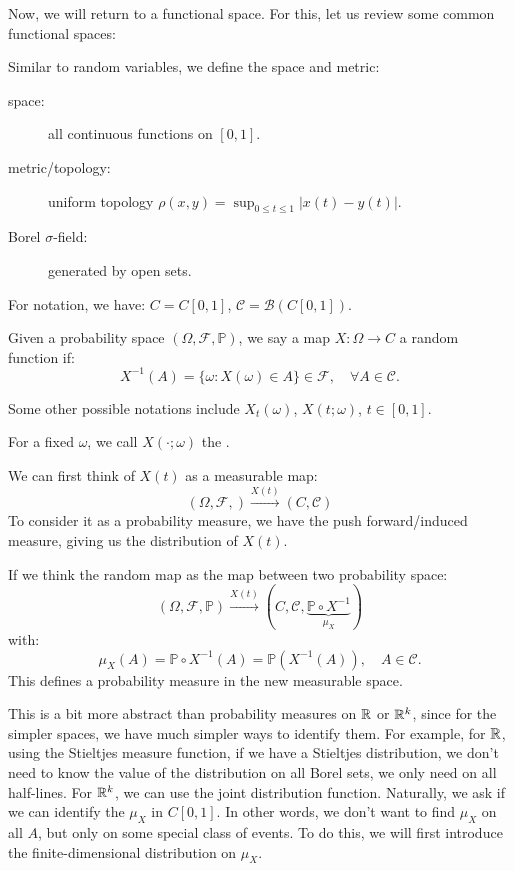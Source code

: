 \documentclass[../main/main.tex]{subfiles}
\begin{document}
Now, we will return to a functional space. For this, let us review some common functional spaces:

\begin{definition}
	Similar to random variables, we define the space and metric:
	\begin{description}
		\item[space:]  all continuous functions on $[0,1]$.
		\item[metric/topology:] uniform topology $\rho(x,y) = \sup_{0 \leq t \leq 1}|x(t)-y(t)|$.
		\item[Borel $\sigma$-field:] generated by open sets.
	\end{description}
	For notation, we have: $C=C[0,1]$, $\mathscr{C} = \mathscr{B}(C[0,1])$.
\end{definition}

\begin{definition}
	Given a probability space $(\Omega, \mathscr{F} , \mathbb{P})$, we say a map $X : \Omega \to C$ a random function if: \[
		X^{-1}(A) = \{\omega : X(\omega) \in A\} \in \mathscr{F} , \quad \forall A \in \mathscr{C}.
	\]
\end{definition}
\begin{remark}
	Some other possible notations include $X_t(\omega)$, $X(t;\omega)$, $t \in[0,1]$.
\end{remark}
For a fixed $\omega$, we call $X(\cdot; \omega)$ the .

We can first think of $X(t)$ as a measurable map: \[
	(\Omega, \mathscr{F},) \overset{X(t)}{\to} (C, \mathscr{C})
\] To consider it as a probability measure, we have the push forward/induced measure, giving us the distribution of $X(t)$.
\begin{definition}[Distribution of $X(t)$]
	If we think the random map as the map between two probability space: \[
		(\Omega, \mathscr{F},\mathbb{P}) \overset{X(t)}{\to} (C, \mathscr{C}, \underbrace{\mathbb{P} \circ X^{-1}}_{\mu_X})
	\] with: \[
		\mu_X(A) = \mathbb{P} \circ X^{-1}(A) = \mathbb{P}(X^{-1}(A)), \quad A \in \mathscr{C}.
	\]
	This defines a probability measure in the new measurable space.
\end{definition}

This is a bit more abstract than probability measures on $\mathbb{R}$ or $\mathbb{R}^{k}$, since for the simpler spaces, we have much simpler ways to identify them.
For example, for $\mathbb{R}$, using the Stieltjes measure function, if we have a Stieltjes distribution, we don't need to know the value of the distribution on all Borel sets, we only need on all half-lines. For $\mathbb{R}^{k}$, we can use the joint distribution function. Naturally, we ask if we can identify the $\mu_X$ in $C[0,1]$. In other words, we don't want to find $\mu_X$ on all $A$, but only on some special class of events. To do this, we will first introduce the finite-dimensional distribution on $\mu_X$.
\end{document}
